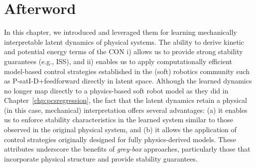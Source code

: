 \newpage








\section*{Afterword}
In this chapter, we introduced  and leveraged them for learning mechanically interpretable latent dynamics of physical systems.
The ability to derive kinetic and potential energy terms of the \gls{CON} i) allows us to provide strong stability guarantees (e.g., \gls{ISS}), and ii) enables us to apply computationally efficient model-based control strategies established in the (soft) robotics community such as P-satI-D+feedforward directly in latent space.
Although the learned dynamics no longer map directly to a physics-based soft robot model as they did in Chapter~\ref{chp:pcsregression}, the fact that the latent dynamics retain a physical (in this case, mechanical) interpretation offers several advantages: (a) it enables us to enforce stability characteristics in the learned system similar to those observed in the original physical system, and (b) it allows the application of control strategies originally designed for fully physics-derived models. These attributes underscore the benefits of \emph{grey-box} approaches, particularly those that incorporate physical structure and provide stability guarantees.


